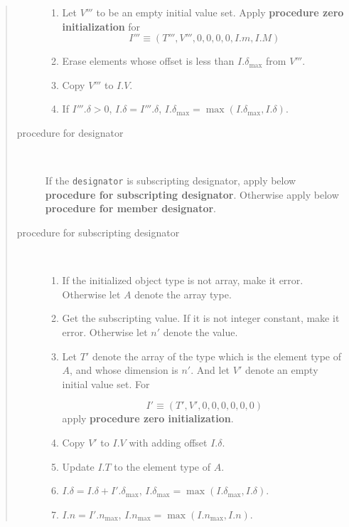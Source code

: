 \begin{quotation}
\begin{description}
\begin{enumerate}
\item \label{initializer015}
Let $V'''$ to be an empty initial value set.
Apply {\bf procedure zero initialization} for
\[
 I''' \equiv (T''',V''',0,0,0,0,I.m,I.M)
\]

\item Erase elements whose offset is less than $I.{\delta}_{\max}$
from $V'''$. 

\item Copy $V'''$ to $I.V$.

\item If $I'''.\delta > 0$,
$I.\delta = I'''.\delta$,
$I.\delta_{\max} = \max(I.\delta_{\max},I.\delta)$.

\end{enumerate}

\item[procedure for designator]

\

If the {\tt{designator}} is subscripting designator,
apply below {\bf procedure for subscripting designator}.
Otherwise apply below {\bf procedure for member designator}.

\item[procedure for subscripting designator]

\

\begin{enumerate}
\item If the initialized object type is not array, make it error.
      Otherwise let $A$ denote the array type.
\item Get the subscripting value. If it is not integer constant,
      make it error. Otherwise let $n'$ denote the value.
\item Let $T'$ denote the array of the type which is the element type of
      $A$, and whose dimension is $n'$. And let $V'$ denote an empty
      initial value set. For

\[
 I' \equiv (T',V',0,0,0,0,0,0) 
\]
apply {\bf procedure zero initialization}.

\item Copy $V'$ to $I.V$ with adding offset $I.\delta$.

\item Update $I.T$ to the element type of $A$.
\item $I.\delta = I.\delta + I'.{\delta_{\max}}$,  
      $I.{\delta_{\max}} = {\max}(I.{\delta_{\max}},I.\delta)$.
\item $I.n = I'.n_{\max}$,
      $I.n_{\max} = {\max}(I.n_{\max},I.n)$.
\end{enumerate}


\end{description}
\end{quotation}
